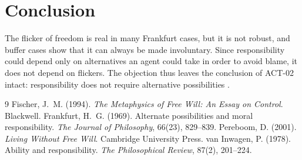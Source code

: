 \documentclass{situationist-preprint}
\begin{document}
\section{Conclusion}

The flicker of freedom is real in many Frankfurt cases, but it is not robust, and buffer cases show that it can always be made involuntary. Since responsibility could depend only on alternatives an agent could take in order to avoid blame, it does not depend on flickers. The objection thus leaves the conclusion of ACT-02 intact: responsibility does not require alternative possibilities \citep{Frankfurt1969, Pereboom2001}.

\begin{thebibliography}{9}
 Fischer, J.~M. (1994). \emph{The Metaphysics of Free Will: An Essay on Control}. Blackwell.
 Frankfurt, H.~G. (1969). Alternate possibilities and moral responsibility. \emph{The Journal of Philosophy}, 66(23), 829--839.
 Pereboom, D. (2001). \emph{Living Without Free Will}. Cambridge University Press.
 van Inwagen, P. (1978). Ability and responsibility. \emph{The Philosophical Review}, 87(2), 201--224.
\end{thebibliography}
\end{document}
